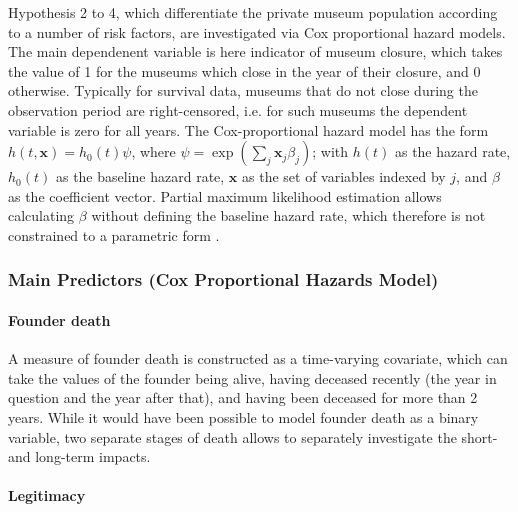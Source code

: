 \documentclass[12pt]{article}
\begin{document}
Hypothesis 2 to 4, which differentiate the private museum population according to a number of risk factors, are investigated via Cox proportional hazard models. 
The main dependenent variable is here indicator of museum closure, which takes the value of 1 for the museums which close in the year of their closure, and 0 otherwise.
Typically for survival data, museums that do not close during the observation period are right-censored, i.e. for such museums the dependent variable is zero for all years.
The Cox-proportional hazard model has the form \(h(t,\mathbf{x}) = h_0(t) \psi\), where \(\psi = \exp(\sum_{j} \mathbf{x}_j \beta_j)\); with \(h(t)\) as the hazard rate, \(h_0(t)\) as the baseline hazard rate, \(\mathbf{x}\) as the set of variables indexed by \(j\), and \(\beta\) as the coefficient vector.
Partial maximum likelihood estimation allows calculating \(\beta\) without defining the baseline hazard rate, which therefore is not constrained to a parametric form \parencite{Moore_2015_survival}.
\subsubsection*{Main Predictors (Cox Proportional Hazards Model)}


\paragraph*{Founder death}

A measure of founder death is constructed as a time-varying covariate, which can take the values of the founder being alive, having deceased recently (the year in question and the year after that), and having been deceased for more than 2 years.
While it would have been possible to model founder death as a binary variable, two separate stages of death allows to separately investigate the short- and long-term impacts.
\paragraph*{Legitimacy}
\end{document}
